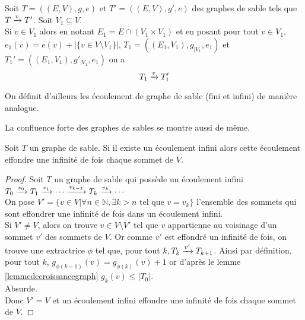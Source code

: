 \begin{lem}
\label{lemmeextractiongraph}
Soit $T=((E,V),g,e)$ et $T'=((E,V),g',e)$ des graphes de sable tels que $T\xrightarrow{v}T'$. Soit $V_1 \subseteq V $. \\
Si $v\in V_1$ alors en notant $E_1 = E \cap (V_1 \times V_1  )$ et en posant pour tout $v\in V_1$, $e_1(v)=e(v) + |\{v\in V \setminus V_1\}|$, $T_1 = ((E_1,V_1),g_{|V_1},e_1)$ et $ T_1'= ((E_1,V_1),g'_{|V_1},e_1) $ on a 
\begin{equation*} T_1 \xrightarrow{v} T_1' \end{equation*}
\end{lem}


\begin{rem}
On définit d'ailleurs les écoulement de graphe de sable (fini et infini) de manière analogue.

La confluence forte des graphes de sables se montre aussi de même.
\end{rem}

\begin{lem}
\label{lemmeecoulementinfini}
 Soit $T$ un graphe de sable. Si il existe un écoulement infini alors cette écoulement effondre une infinité de fois chaque sommet de $V$.
\end{lem}

\begin{proof}
Soit $T$ un graphe de sable qui possède un écoulement infini $T_0\xrightarrow{v_0}T_1\xrightarrow{v_1} \cdots \xrightarrow{v_{k-1}} T_k \xrightarrow{v_k} \cdots$\\
On pose $V'=\{v\in V | \forall n \in \mathbb{N}, \exists k > n \text{ tel que } v = v_k\}$ l'ensemble des sommets qui sont effondrer une infinité de fois dans un écoulement infini.\\
Si $V'\neq V$, alors on trouve $v\in V\setminus V'$ tel que $v$ appartienne au voisinage d'un sommet $v'$ des sommets de $V$. Or comme $v'$ est effondré un infinité de fois, on trouve une extractrice $\phi$ tel que, pour tout $k, T_k \xrightarrow{v'} T_{k+1}$. Ainsi par définition, pour tout $k$, $g_{\phi(k+1)}(v) = g_{\phi(k)}(v) + 1$ or d'après le lemme \ref{lemmedecroissancegraph} $g_{k}(v)\leq|T_0|$.\\
Absurde.\\
Donc $V'=V$ et un écoulement infini effondre une infinité de fois chaque sommet de $V$.
\end{proof}

